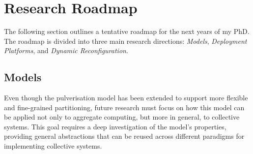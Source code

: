 \documentclass[runningheads]{llncs}
\begin{document}



\section{Research Roadmap}
\label{sec:future-directions}
The following section outlines a tentative roadmap for the next years of my PhD.
%
The roadmap is divided into three main research directions: \emph{Models},
\emph{Deployment Platforms},
and \emph{Dynamic Reconfiguration}.

\subsection{Models}
Even though the pulverisation model has been extended to support more flexible and fine-grained partitioning,
future research must focus on how this model can be applied not only to aggregate computing,
but more in general,
to collective systems.
%
This goal requires a deep investigation of the model's properties,
providing general abstractions that can be reused across different paradigms for implementing collective systems.
\end{document}
